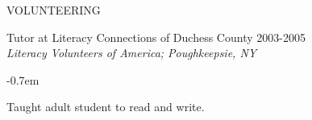 \documentclass{resume} %
\begin{document}
\begin{rSection}{VOLUNTEERING}
{Tutor at Literacy Connections of Duchess County \hfill 2003-2005\\ \textit{Literacy Volunteers of America; Poughkeepsie, NY}\\
\vspace{-1.3em}
  \begin{list}{}{\leftmargin=1em \rightmargin=7em } 
   \itemsep -0.7em \vspace{-0.6em} 
   \item Taught adult student to read and write.
  \end{list}}
\end{rSection}
\end{document}
